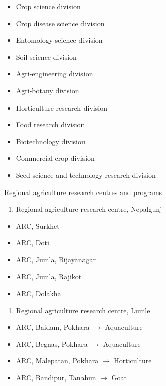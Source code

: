 \documentclass[
  openany]{book}
\providecommand{\tightlist}{%
  \setlength{\itemsep}{0pt}\setlength{\parskip}{0pt}}
\begin{document}
\begin{itemize}
  \begin{itemize}
  \tightlist
  \item
    Crop science division
  \item
    Crop disease science division
  \item
    Entomology science division
  \item
    Soil science division
  \item
    Agri-engineering division
  \item
    Agri-botany division
  \item
    Horticulture research division
  \item
    Food research division
  \item
    Biotechnology division
  \item
    Commercial crop division
  \item
    Seed science and technology research division
  \end{itemize}
\end{itemize}

Regional agriculture research centres and programs

\begin{enumerate}
\def\labelenumi{\arabic{enumi}.}
\tightlist
\item
  Regional agriculture research centre, Nepalgunj
\end{enumerate}

\begin{itemize}
\tightlist
\item
  ARC, Surkhet
\item
  ARC, Doti
\item
  ARC, Jumla, Bijayanagar
\item
  ARC, Jumla, Rajikot
\item
  ARC, Dolakha
\end{itemize}

\begin{enumerate}
\def\labelenumi{\arabic{enumi}.}
\setcounter{enumi}{1}
\tightlist
\item
  Regional agriculture research centre, Lumle
\end{enumerate}

\begin{itemize}
\tightlist
\item
  ARC, Baidam, Pokhara \(\rightarrow\) Aquaculture
\item
  ARC, Begnas, Pokhara \(\rightarrow\) Aquaculture
\item
  ARC, Malepatan, Pokhara \(\rightarrow\) Horticulture
\item
  ARC, Bandipur, Tanahun \(\rightarrow\) Goat
\end{itemize}
\end{document}
